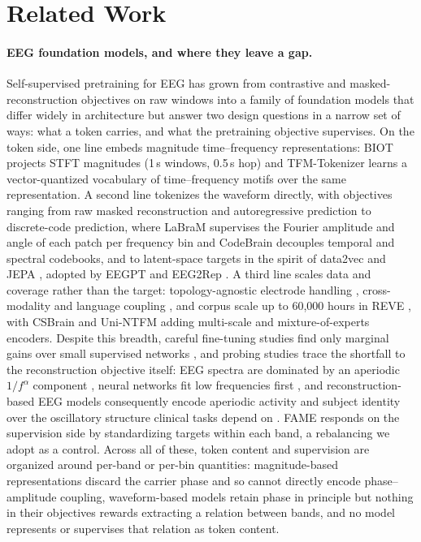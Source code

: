 \section{Related Work}
\label{sec:related}

\paragraph{EEG foundation models, and where they leave a gap.}
Self-supervised pretraining for EEG has grown from contrastive and
masked-reconstruction objectives on raw windows
\citep{kostas2021bendr,chien2022maeeg,wang2023brainbert} into a family of
foundation models that differ widely in architecture but answer two design
questions in a narrow set of ways: what a token carries, and what the
pretraining objective supervises. On the token side, one line embeds
magnitude time--frequency representations: BIOT \citep{yang2023biot}
projects STFT magnitudes (1\,s windows, 0.5\,s hop) and TFM-Tokenizer
\citep{pradeepkumar2026tfm} learns a vector-quantized vocabulary of
time--frequency motifs over the same representation. A second line
tokenizes the waveform directly, with objectives ranging from raw masked
reconstruction \citep{chien2022maeeg,chen2024eegformer,wang2025cbramod,doner2025luna}
and autoregressive prediction \citep{cui2024neurogpt} to discrete-code
prediction, where LaBraM \citep{jiang2024labram} supervises the Fourier
amplitude and angle of each patch per frequency bin and CodeBrain
\citep{ma2026codebrain} decouples temporal and spectral codebooks, and to
latent-space targets in the spirit of data2vec and JEPA
\citep{baevski2022data2vec,assran2023self}, adopted by EEGPT
\citep{wang2024eegpt} and EEG2Rep \citep{foumani2024eeg2rep}. A third line
scales data and coverage rather than the target: topology-agnostic
electrode handling \citep{yi2023learning,doner2025luna}, cross-modality and
language coupling \citep{yuan2024brant2,jiang2025neurolm}, and corpus scale
up to 60{,}000 hours in REVE \citep{bertrand2025reve}, with CSBrain
\citep{zhou2025csbrain} and Uni-NTFM \citep{chen2026unintfm} adding
multi-scale and mixture-of-experts encoders. Despite this breadth, careful
fine-tuning studies find only marginal gains over small supervised networks
\citep{lee2025are}, and probing studies trace the shortfall to the
reconstruction objective itself: EEG spectra are dominated by an aperiodic
$1/f^{\alpha}$ component \citep{donoghue2020parameterizing}, neural
networks fit low frequencies first \citep{rahaman2019spectral}, and
reconstruction-based EEG models consequently encode aperiodic activity and
subject identity over the oscillatory structure clinical tasks depend on
\citep{kommineni2026aperiodic,bindra2026spectral}. FAME
\citep{yu2026understanding} responds on the supervision side by
standardizing targets within each band, a rebalancing we adopt as a
control. Across all of these, token content and supervision are organized
around per-band or per-bin quantities: magnitude-based representations
discard the carrier phase and so cannot directly encode phase--amplitude
coupling, waveform-based models retain phase in principle but nothing in
their objectives rewards extracting a relation between bands, and no
model represents or supervises that relation as token content.

